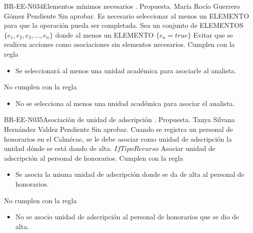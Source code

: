 \begin{BusinessRule}{BR-EE-N034}{Elementos mínimos necesarios}
	{\bcIntegridad}    %
	{\btEnabler}     %
	{\blControlling}    %
	.
	\BRItem[Estado] Propuesta.
	 María Rocío Guerrero Gómez
	 Pendiente
	 Sin aprobar.
	\BRItem[Descripción] Es necesario seleccionar al menos un ELEMENTO para que la operación pueda ser completada.
	\BRItem[Sentencia]  Sea un conjunto de ELEMENTOS $ \{e_1, e_2, e_3, ..., e_n\}$ donde al menos un ELEMENTO $\{e_n = true\}$
	\BRItem[Motivación] Evitar que se realicen acciones como asociaciones sin elementos necesarios.
	 Cumplen con la regla
	\begin{itemize}
		\item Se seleccionará al menos una unidad académica para asociarle al analista.
	\end{itemize}
	 No cumplen con la regla
	\begin{itemize}
		\item No se selecciona al menos una unidad académica para asociar el analista.
	\end{itemize}
\end{BusinessRule}

\begin{BusinessRule}{BR-EE-N035}{Asociación de unidad de adscripción}
	{\bcIntegridad}    %
	{\btEnabler}     %
	{\blControlling}    %
	.
	\BRItem[Estado] Propuesta.
	 Tanya Silvana Hernández Valdez
	 Pendiente
	 Sin aprobar.
	\BRItem[Descripción] Cuando se registra un personal de honorarios en el Calmécac, se le debe asociar como unidad de adscripción la unidad dónde se está dando de alta.
	\BRItem[Sentencia] $If TipoRecurso $  
	\BRItem[Motivación] Asociar unidad de adscripción al personal de honorarios.
	 Cumplen con la regla
	\begin{itemize}
		\item Se asocia la misma unidad de adscripción donde se da de alta al personal de honorarios.
	\end{itemize}
	 No cumplen con la regla
	\begin{itemize}
		\item No se asocio unidad de adscripción al personal de honorarios que se dio de alta.
	\end{itemize}
\end{BusinessRule}

